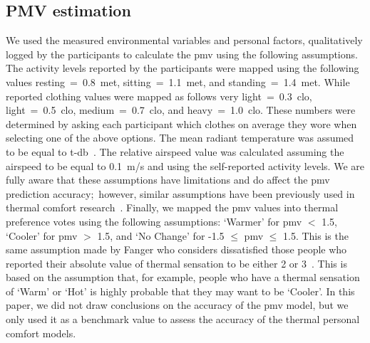 \subsection{PMV estimation}\label{subsubsec:pmv-estimation}
We used the measured environmental variables and personal factors, qualitatively logged by the participants to calculate the \ac{pmv} using the following assumptions.
The activity levels reported by the participants were mapped using the following values resting~=~0.8~met, sitting~=~1.1~met, and standing~=~1.4~met.
While reported clothing values were mapped as follows very light~=~0.3~clo, light~=~0.5~clo, medium~=~0.7~clo, and heavy~=~1.0~clo.
These numbers were determined by asking each participant which clothes on average they wore when selecting one of the above options.
The mean radiant temperature was assumed to be equal to \ac{t-db}~\cite{Dawe2020}.
The relative airspeed value was calculated assuming the airspeed to be equal to 0.1~m/s and using the self-reported activity levels.
We are fully aware that these assumptions have limitations and do affect the \ac{pmv} prediction accuracy;\
however, similar assumptions have been previously used in thermal comfort research~\cite{Kim2018}.
Finally, we mapped the \ac{pmv} values into thermal preference votes using the following assumptions: `Warmer' for \ac{pmv} $<$ 1.5, `Cooler' for \ac{pmv} $>$ 1.5, and `No Change' for -1.5 $\leq$ \ac{pmv} $\leq$ 1.5.
This is the same assumption made by Fanger who considers dissatisfied those people who reported their absolute value of thermal sensation to be either 2 or 3~\cite{Fanger1970}.
This is based on the assumption that, for example, people who have a thermal sensation of `Warm' or `Hot' is highly probable that they may want to be `Cooler'.
In this paper, we did not draw conclusions on the accuracy of the \ac{pmv} model, but we only used it as a benchmark value to assess the accuracy of the thermal personal comfort models.

